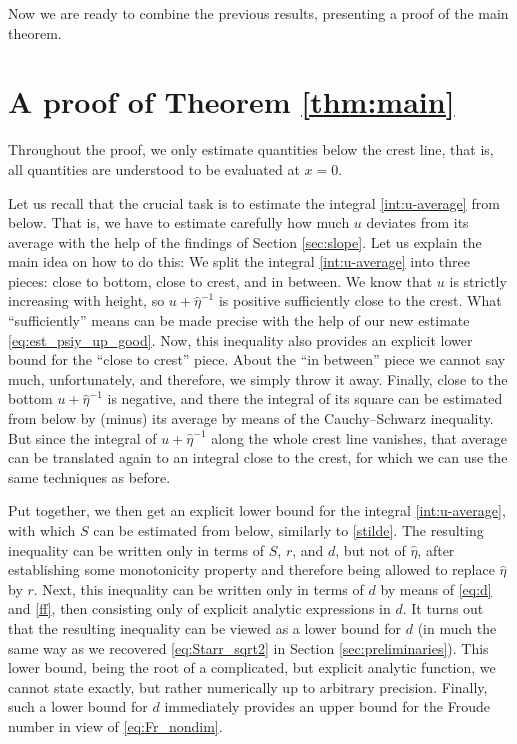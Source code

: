 \documentclass{amsart}
\theoremstyle{definition}
\begin{document}
Now we are ready to combine the previous results, presenting a proof of the main theorem.

\section{A proof of Theorem \ref{thm:main}}\label{sec:proof}
Throughout the proof, we only estimate quantities below the crest line, that is, all quantities are understood to be evaluated at $x=0$.

Let us recall that the crucial task is to estimate the integral \eqref{int:u-average} from below. That is, we have to estimate carefully how much $u$ deviates from its average with the help of the findings of Section \ref{sec:slope}. Let us explain the main idea on how to do this: We split the integral \eqref{int:u-average} into three pieces: close to bottom, close to crest, and in between. We know that $u$ is strictly increasing with height, so $u+\hat\eta^{-1}$ is positive sufficiently close to the crest. What \enquote{sufficiently} means can be made precise with the help of our new estimate \eqref{eq:est_psiy_up_good}. Now, this inequality also provides an explicit lower bound for the \enquote{close to crest} piece. About the \enquote{in between} piece we cannot say much, unfortunately, and therefore, we simply throw it away. Finally, close to the bottom $u+\hat\eta^{-1}$ is negative, and there the integral of its square can be estimated from below by (minus) its average by means of the Cauchy--Schwarz inequality. But since the integral of $u+\hat\eta^{-1}$ along the whole crest line vanishes, that average can be translated again to an integral close to the crest, for which we can use the same techniques as before.

Put together, we then get an explicit lower bound for the integral \eqref{int:u-average}, with which $S$ can be estimated from below, similarly to \eqref{stilde}. The resulting inequality can be written only in terms of $S$, $r$, and $d$, but not of $\hat\eta$, after establishing some monotonicity property and therefore being allowed to replace $\hat\eta$ by $r$. Next, this inequality can be written only in terms of $d$ by means of \eqref{eq:d} and \eqref{ff}, then consisting only of explicit analytic expressions in $d$. It turns out that the resulting inequality can be viewed as a lower bound for $d$ (in much the same way as we recovered \eqref{eq:Starr_sqrt2} in Section \ref{sec:preliminaries}). This lower bound, being the root of a complicated, but explicit analytic function, we cannot state exactly, but rather numerically up to arbitrary precision. Finally, such a lower bound for $d$ immediately provides an upper bound for the Froude number in view of \eqref{eq:Fr_nondim}.
\end{document}
